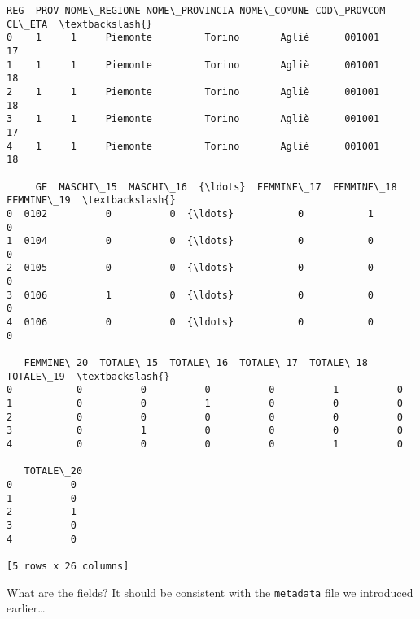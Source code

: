 \documentclass[11pt]{article}
\makeatletter
\newcommand{\boxspacing}{\kern\kvtcb@left@rule\kern\kvtcb@boxsep}
\newcommand{\prompt}[4]{
        \ttfamily\llap{{\color{#2}[#3]:\hspace{3pt}#4}}\vspace{-\baselineskip}
    }
\makeatother
\begin{document}
            \begin{tcolorbox}[breakable, size=fbox, boxrule=.5pt, pad at break*=1mm, opacityfill=0]
\prompt{Out}{outcolor}{14}{\boxspacing}
\begin{Verbatim}[commandchars=\\\{\}]
   REG  PROV NOME\_REGIONE NOME\_PROVINCIA NOME\_COMUNE COD\_PROVCOM  CL\_ETA  \textbackslash{}
0    1     1     Piemonte         Torino       Agliè      001001      17
1    1     1     Piemonte         Torino       Agliè      001001      18
2    1     1     Piemonte         Torino       Agliè      001001      18
3    1     1     Piemonte         Torino       Agliè      001001      17
4    1     1     Piemonte         Torino       Agliè      001001      18

     GE  MASCHI\_15  MASCHI\_16  {\ldots}  FEMMINE\_17  FEMMINE\_18  FEMMINE\_19  \textbackslash{}
0  0102          0          0  {\ldots}           0           1           0
1  0104          0          0  {\ldots}           0           0           0
2  0105          0          0  {\ldots}           0           0           0
3  0106          1          0  {\ldots}           0           0           0
4  0106          0          0  {\ldots}           0           0           0

   FEMMINE\_20  TOTALE\_15  TOTALE\_16  TOTALE\_17  TOTALE\_18  TOTALE\_19  \textbackslash{}
0           0          0          0          0          1          0
1           0          0          1          0          0          0
2           0          0          0          0          0          0
3           0          1          0          0          0          0
4           0          0          0          0          1          0

   TOTALE\_20
0          0
1          0
2          1
3          0
4          0

[5 rows x 26 columns]
\end{Verbatim}
\end{tcolorbox}
        
    What are the fields? It should be consistent with the \texttt{metadata}
file we introduced earlier\ldots{}
\end{document}

